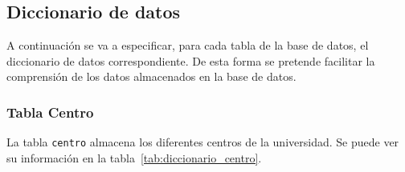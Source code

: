 \subsection{Diccionario de datos}
A continuación se va a especificar, para cada tabla de la base de datos, el diccionario de datos correspondiente.
De esta forma se pretende facilitar la comprensión de los datos almacenados en la base de datos.
\subsubsection{Tabla Centro}
La tabla \texttt{centro} almacena los diferentes centros de la universidad. 
Se puede ver su información en la tabla~\ref{tab:diccionario_centro}.
\begin{table}[h]
  \caption{Diccionario de datos. Tabla Centro}
  \label{tab:diccionario_centro}
\end{table}

